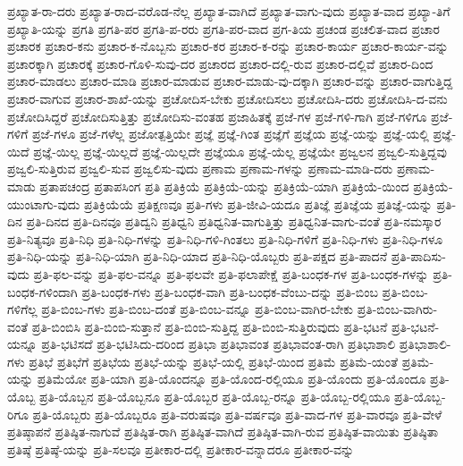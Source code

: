 {ಪ್ರಖ್ಯಾತ-ರಾ-ದರು
ಪ್ರಖ್ಯಾತ-ರಾದ-ವರೊಡ-ನೆಲ್ಲ
ಪ್ರಖ್ಯಾತ-ವಾಗಿದೆ
ಪ್ರಖ್ಯಾತ-ವಾಗು-ವುದು
ಪ್ರಖ್ಯಾತ-ವಾದ
ಪ್ರಖ್ಯಾ-ತಿಗೆ
ಪ್ರಖ್ಯಾತಿ-ಯನ್ನು
ಪ್ರಗತಿ
ಪ್ರಗತಿ-ಪರ
ಪ್ರಗತಿ-ಪ-ರರು
ಪ್ರಗತಿ-ಪರ-ವಾದ
ಪ್ರಗ-ತಿಯ
ಪ್ರಚಂಡ
ಪ್ರಚಲಿತ-ವಾದ
ಪ್ರಚಾರ
ಪ್ರಚಾರಕ
ಪ್ರಚಾರ-ಕನು
ಪ್ರಚಾರ-ಕ-ನೊಬ್ಬನು
ಪ್ರಚಾರ-ಕರ
ಪ್ರಚಾರ-ಕ-ರನ್ನು
ಪ್ರಚಾರ-ಕಾರ್ಯ
ಪ್ರಚಾರ-ಕಾರ್ಯ-ವನ್ನು
ಪ್ರಚಾರಕ್ಕಾಗಿ
ಪ್ರಚಾರಕ್ಕೆ
ಪ್ರಚಾರ-ಗೊಳಿ-ಸುವು-ದರ
ಪ್ರಚಾರದ
ಪ್ರಚಾರ-ದಲ್ಲಿ-ರುವ
ಪ್ರಚಾರ-ದಲ್ಲಿವೆ
ಪ್ರಚಾರ-ದಿಂದ
ಪ್ರಚಾರ-ಮಾಡಲು
ಪ್ರಚಾರ-ಮಾಡಿ
ಪ್ರಚಾರ-ಮಾಡುವ
ಪ್ರಚಾರ-ಮಾಡು-ವು-ದಕ್ಕಾಗಿ
ಪ್ರಚಾರ-ವನ್ನು
ಪ್ರಚಾರ-ವಾಗುತ್ತಿದ್ದ
ಪ್ರಚಾರ-ವಾಗುವ
ಪ್ರಚಾರ-ಶಾಖೆ-ಯನ್ನು
ಪ್ರಚೋದಿಸ-ಬೇಕು
ಪ್ರಚೋದಿಸಲು
ಪ್ರಚೋದಿಸಿ-ದರು
ಪ್ರಚೋದಿಸಿ-ದ-ವನು
ಪ್ರಚೋದಿಸಿದ್ದರೆ
ಪ್ರಚೋದಿಸುತ್ತಿತ್ತು
ಪ್ರಚೋದಿಸು-ವಂತಹ
ಪ್ರಜಾಹಿತಕ್ಕೆ
ಪ್ರಜೆ-ಗಳ
ಪ್ರಜೆ-ಗಳಿ-ಗಾಗಿ
ಪ್ರಜೆ-ಗಳಿಗೂ
ಪ್ರಜೆ-ಗಳಿಗೆ
ಪ್ರಜೆ-ಗಳೂ
ಪ್ರಜೆ-ಗಳೆಲ್ಲ
ಪ್ರಜೋತ್ಪತ್ತಿಯೇ
ಪ್ರಜ್ಞೆ
ಪ್ರಜ್ಞೆ-ಗಿಂತ
ಪ್ರಜ್ಞೆಗೆ
ಪ್ರಜ್ಞೆಯ
ಪ್ರಜ್ಞೆ-ಯನ್ನು
ಪ್ರಜ್ಞೆ-ಯಲ್ಲಿ
ಪ್ರಜ್ಞೆ-ಯಿದೆ
ಪ್ರಜ್ಞೆ-ಯಿಲ್ಲ
ಪ್ರಜ್ಞೆ-ಯಿಲ್ಲದೆ
ಪ್ರಜ್ಞೆ-ಯಿಲ್ಲದೇ
ಪ್ರಜ್ಞೆಯೂ
ಪ್ರಜ್ಞೆ-ಯೆಲ್ಲ
ಪ್ರಜ್ಞೆಯೇ
ಪ್ರಜ್ವಲನ
ಪ್ರಜ್ವಲಿ-ಸುತ್ತಿದ್ದವು
ಪ್ರಜ್ವಲಿ-ಸುತ್ತಿರುವ
ಪ್ರಜ್ವಲಿ-ಸುವ
ಪ್ರಜ್ವಲಿಸು-ವುದು
ಪ್ರಣಾಮ
ಪ್ರಣಾಮ-ಗಳನ್ನು
ಪ್ರಣಾಮ-ಮಾಡಿ-ದರು
ಪ್ರಣಾಮ-ಮಾಡು
ಪ್ರತಾಪಚಂದ್ರ
ಪ್ರತಾಪಸಿಂಗ
ಪ್ರತಿ
ಪ್ರತಿಕ್ರಿಯೆ
ಪ್ರತಿಕ್ರಿಯೆ-ಯನ್ನು
ಪ್ರತಿಕ್ರಿಯೆ-ಯಾಗಿ
ಪ್ರತಿಕ್ರಿಯೆ-ಯಿಂದ
ಪ್ರತಿಕ್ರಿಯೆ-ಯುಂಟಾಗು-ವುದು
ಪ್ರತಿಕ್ರಿಯೆಯೆ
ಪ್ರತಿಕ್ಷಣವೂ
ಪ್ರತಿ-ಗಳು
ಪ್ರತಿ-ಜೀವಿ-ಯದೂ
ಪ್ರತಿಜ್ಞೆ
ಪ್ರತಿಜ್ಞೆಯ
ಪ್ರತಿಜ್ಞೆ-ಯನ್ನು
ಪ್ರತಿ-ದಿನ
ಪ್ರತಿ-ದಿನದ
ಪ್ರತಿ-ದಿನವೂ
ಪ್ರತಿದ್ವನಿ
ಪ್ರತಿಧ್ವನಿ
ಪ್ರತಿಧ್ವನಿತ-ವಾಗುತ್ತಿತ್ತು
ಪ್ರತಿಧ್ವನಿತ-ವಾಗು-ವಂತೆ
ಪ್ರತಿ-ನಮಸ್ಕಾರ
ಪ್ರತಿ-ನಿತ್ಯವೂ
ಪ್ರತಿ-ನಿಧಿ
ಪ್ರತಿ-ನಿಧಿ-ಗಳನ್ನು
ಪ್ರತಿ-ನಿಧಿ-ಗಳಿ-ಗಿಂತಲು
ಪ್ರತಿ-ನಿಧಿ-ಗಳಿಗೆ
ಪ್ರತಿ-ನಿಧಿ-ಗಳು
ಪ್ರತಿ-ನಿಧಿ-ಗಳೂ
ಪ್ರತಿ-ನಿಧಿ-ಯನ್ನು
ಪ್ರತಿ-ನಿಧಿ-ಯಾಗಿ
ಪ್ರತಿ-ನಿಧಿ-ಯಾದ
ಪ್ರತಿ-ನಿಧಿ-ಯೊಬ್ಬರು
ಪ್ರತಿ-ಪಕ್ಷದ
ಪ್ರತಿ-ಪಾದನೆ
ಪ್ರತಿ-ಪಾದಿಸು-ವುದು
ಪ್ರತಿ-ಫಲ-ವನ್ನು
ಪ್ರತಿ-ಫಲ-ವನ್ನೂ
ಪ್ರತಿ-ಫಲವೇ
ಪ್ರತಿ-ಫಲಾಪೇಕ್ಷೆ
ಪ್ರತಿ-ಬಂಧಕ-ಗಳ
ಪ್ರತಿ-ಬಂಧಕ-ಗಳನ್ನು
ಪ್ರತಿ-ಬಂಧಕ-ಗಳಿಂದಾಗಿ
ಪ್ರತಿ-ಬಂಧಕ-ಗಳು
ಪ್ರತಿ-ಬಂಧಕ-ವಾಗಿ
ಪ್ರತಿ-ಬಂಧಕ-ವೆಂಬು-ದನ್ನು
ಪ್ರತಿ-ಬಿಂಬ
ಪ್ರತಿ-ಬಿಂಬ-ಗಳಿಗೆಲ್ಲ
ಪ್ರತಿ-ಬಿಂಬ-ಗಳು
ಪ್ರತಿ-ಬಿಂಬ-ದಂತೆ
ಪ್ರತಿ-ಬಿಂಬ-ವನ್ನೂ
ಪ್ರತಿ-ಬಿಂಬ-ವಾಗಿರ-ಬೇಕು
ಪ್ರತಿ-ಬಿಂಬ-ವಾಗಿರು-ವಂತೆ
ಪ್ರತಿ-ಬಿಂಬಿಸಿ
ಪ್ರತಿ-ಬಿಂಬಿ-ಸುತ್ತಾನೆ
ಪ್ರತಿ-ಬಿಂಬಿ-ಸುತ್ತಿದ್ದ
ಪ್ರತಿ-ಬಿಂಬಿ-ಸುತ್ತಿರುವುದು
ಪ್ರತಿ-ಭಟನೆ
ಪ್ರತಿ-ಭಟನೆ-ಯನ್ನೂ
ಪ್ರತಿ-ಭಟಿಸದೆ
ಪ್ರತಿ-ಭಟಿಸಿದು-ದರಿಂದ
ಪ್ರತಿಭಾ
ಪ್ರತಿಭಾವಂತ
ಪ್ರತಿಭಾವಂತ-ರಾಗಿ
ಪ್ರತಿಭಾಶಾಲಿ
ಪ್ರತಿಭಾಶಾಲಿ-ಗಳು
ಪ್ರತಿಭೆ
ಪ್ರತಿಭೆಗೆ
ಪ್ರತಿಭೆಯ
ಪ್ರತಿಭೆ-ಯನ್ನು
ಪ್ರತಿಭೆ-ಯಲ್ಲಿ
ಪ್ರತಿಭೆ-ಯಿಂದ
ಪ್ರತಿಮೆ
ಪ್ರತಿಮೆ-ಯಂತೆ
ಪ್ರತಿಮೆ-ಯನ್ನು
ಪ್ರತಿಮೆಯೋ
ಪ್ರತಿ-ಯಾಗಿ
ಪ್ರತಿ-ಯೊಂದನ್ನೂ
ಪ್ರತಿ-ಯೊಂದ-ರಲ್ಲಿಯೂ
ಪ್ರತಿ-ಯೊಂದು
ಪ್ರತಿ-ಯೊಂದೂ
ಪ್ರತಿ-ಯೊಬ್ಬ
ಪ್ರತಿ-ಯೊಬ್ಬನ
ಪ್ರತಿ-ಯೊಬ್ಬನೂ
ಪ್ರತಿ-ಯೊಬ್ಬರ
ಪ್ರತಿ-ಯೊಬ್ಬ-ರನ್ನೂ
ಪ್ರತಿ-ಯೊಬ್ಬ-ರಲ್ಲಿಯೂ
ಪ್ರತಿ-ಯೊಬ್ಬ-ರಿಗೂ
ಪ್ರತಿ-ಯೊಬ್ಬರು
ಪ್ರತಿ-ಯೊಬ್ಬರೂ
ಪ್ರತಿ-ವರುಷವೂ
ಪ್ರತಿ-ವರ್ಷವೂ
ಪ್ರತಿ-ವಾದ-ಗಳ
ಪ್ರತಿ-ವಾರವೂ
ಪ್ರತಿ-ವೇಳೆ
ಪ್ರತಿಷ್ಠಾಪನೆ
ಪ್ರತಿಷ್ಠಿತ-ನಾಗುವೆ
ಪ್ರತಿಷ್ಠಿತ-ರಾಗಿ
ಪ್ರತಿಷ್ಠಿತ-ವಾಗಿದೆ
ಪ್ರತಿಷ್ಠಿತ-ವಾಗಿ-ರುವ
ಪ್ರತಿಷ್ಠಿತ-ವಾಯಿತು
ಪ್ರತಿಷ್ಠಿತಾ
ಪ್ರತಿಷ್ಠೆ
ಪ್ರತಿಷ್ಠೆ-ಯನ್ನು
ಪ್ರತಿ-ಸಲವೂ
ಪ್ರತೀಕಾರ-ದಲ್ಲಿ
ಪ್ರತೀಕಾರ-ವನ್ನಾದರೂ
ಪ್ರತೀಕಾರ-ವನ್ನು
}
